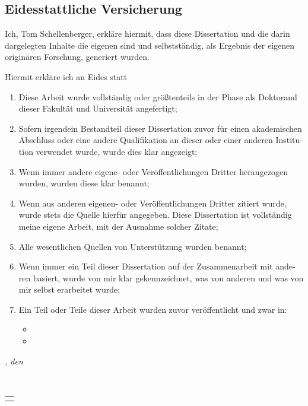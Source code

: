 \begin{otherlanguage}{ngerman}

	\chapter*{Eidesstattliche Versicherung}
	\thispagestyle{empty}
	Ich, Tom Schellenberger, erkläre hiermit, dass diese Dissertation und die darin dargelegten Inhalte die
	eigenen sind und selbstständig, als Ergebnis der eigenen originären Forschung, generiert wurden.

	Hiermit erkläre ich an Eides statt
	\begin{enumerate}
		\item Diese Arbeit wurde vollständig oder größtenteils in der Phase als Doktorand dieser Fakultät und Universität angefertigt;
		\item Sofern irgendein Bestandteil dieser Dissertation zuvor für einen akademischen Abschluss oder eine andere Qualifikation an dieser oder einer anderen Institution verwendet wurde, wurde dies klar angezeigt;
		\item Wenn immer andere eigene- oder Veröffentlichungen Dritter herangezogen wurden, wurden diese klar benannt;
		\item Wenn aus anderen eigenen- oder Veröffentlichungen Dritter zitiert wurde, wurde stets die Quelle hierfür angegeben. Diese Dissertation ist vollständig meine eigene Arbeit, mit der Ausnahme solcher Zitate;
		\item Alle wesentlichen Quellen von Unterstützung wurden benannt;
		\item Wenn immer ein Teil dieser Dissertation auf der Zusammenarbeit mit anderen basiert, wurde von mir klar gekennzeichnet, was von anderen und was von mir selbst erarbeitet wurde;
		\item Ein Teil oder Teile dieser Arbeit wurden zuvor veröffentlicht und zwar in:
		\begin{itemize}
			\item[\cite{Czakon:2023kqm}] 
			\item[\cite{Czakon:2024ywb}] 
		\end{itemize}
	\end{enumerate}

	\bigskip

	\noindent\textit{\myLocation, den \myTime}

	\smallskip

	\begin{flushright}
		\phantom{add signature here} \phantom{~~~~~~~~~~~~}\\
		\vspace{-0.5cm}
	    \begin{tabular}{m{5cm}}
	        \\ \hline
	        \centering\myName \\
	    \end{tabular}
	\end{flushright}

\end{otherlanguage}

